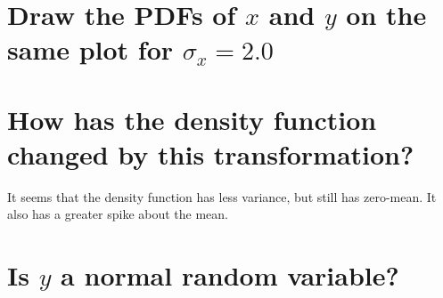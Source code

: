 \documentclass[12pt,letterpaper, onecolumn]{exam}
\begin{document}
\begin{questions}
\begin{parts}
		\part{Draw the PDFs of $x$ and $y$ on the same plot for $\sigma_x = 2.0$}
		\clearpage

		\part{How has the density function changed by this transformation?}

		\solution
		{
			It seems that the density function has less variance, but still has zero-mean. It also has a greater spike about the mean.
		}
		\part{Is $y$ a normal random variable?}

	\end{parts}
\end{questions}
\end{document}
